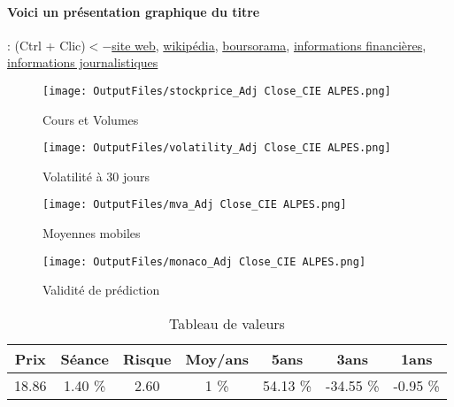 \documentclass[11pt,a4paper]{report}%
\begin{document}
\paragraph{Voici un présentation graphique du titre} : (Ctrl + Clic)$<-$\href{https://www.compagniedesalpes.com/fr/finance}{site web}, \href{https://fr.wikipedia.org/wiki/Compagnie_des_Alpes}{wikipédia}, \href{https://www.boursorama.com/cours/1rPCDA}{boursorama}, \href{https://www.qwant.com/?q=site:https:%2f%2fwww.easybourse.com%2faction-societe%2fCIE-ALPES&t=web&client=ext-firefox-hp}{informations financières}, \href{https://bourse.lerevenu.com/cours-de-bourse/fiche-valeur-synthese/CIE-ALPES/CDA-FR}{informations journalistiques}
\begin{figure}[!htb]
   \begin{minipage}{0.5\textwidth}
     \centering
     \texttt{[image: OutputFiles/stockprice\_Adj Close\_CIE ALPES.png]}
     \caption{Cours et Volumes}\label{Fig:price_CIE ALPES}
   \end{minipage}\hfill
   \begin{minipage}{0.5\textwidth}
     \centering
     \texttt{[image: OutputFiles/volatility\_Adj Close\_CIE ALPES.png]}
     \caption{Volatilité à 30 jours}\label{Fig:volat_CIE ALPES}
   \end{minipage}
\end{figure}
\begin{figure}[!htb]
   \begin{minipage}{0.5\textwidth}
     \centering
     \texttt{[image: OutputFiles/mva\_Adj Close\_CIE ALPES.png]}
     \caption{Moyennes mobiles}\label{Fig:mva_CIE ALPES}
   \end{minipage}\hfill
   \begin{minipage}{0.5\textwidth}
     \centering
     \texttt{[image: OutputFiles/monaco\_Adj Close\_CIE ALPES.png]}
     \caption{Validité de prédiction}\label{Fig:prediction_CIE ALPES}
   \end{minipage}
\end{figure}

\begin{table}[H]
  \centering
    \begin{tabular}{|c|c|c|c|c|c|c|}
    \hline
    Prix & Séance & Risque  & Moy/ans & 5ans & 3ans & 1ans \\
    \hline
    18.86 &    1.40 \%    & 2.60 & 1 \% & 54.13 \% & -34.55 \% & -0.95 \% \\
    \hline
    \end{tabular}%
        \label{tab:table_CIE ALPES}%
      \caption{Tableau de valeurs}
\end{table}%
\end{document}
